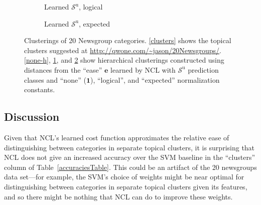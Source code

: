 \documentclass{article} %
\newcommand{\unorderedS}{\mathcal{S}^{\mathrm{u}}}
\newcommand{\ourmethod}{NCL}
\begin{document}
\begin{figure}
\begin{subfigure}{.5\textwidth}
\begin{tikzpicture}
\end{tikzpicture}
\caption{Learned $\unorderedS$, logical}
\label{logical-h}
\end{subfigure}%
\begin{subfigure}{.5\textwidth}
\centering
{}
\caption{Learned $\unorderedS$, expected}
\label{expected-h}
\end{subfigure}
\caption{Clusterings of 20 Newsgroup categories.  \ref{clusters} shows
the topical clusters suggested at \url{http://qwone.com/~jason/20Newsgroups/}.
\ref{none-h}, \ref{logical-h}, and \ref{expected-h} show hierarchical
clusterings constructed using distances from the ``ease'' $\mathbf{e}$ 
learned by \ourmethod{} with $\unorderedS$ prediction classes and
``none'' ($\mathbf{1}$), ``logical'', and ``expected'' normalization
constants.}
\label{hierarchies}
\end{figure}

\subsection{Discussion}

Given that \ourmethod{}'s learned cost function approximates the 
relative ease 
of distinguishing between categories in separate topical clusters, 
it is surprising that \ourmethod{} does not give an increased 
accuracy over the SVM baseline in the ``clusters'' column of
 Table~\ref{accuraciesTable}.
This could be an artifact of the 20 newsgroups data set---for example,
the SVM's choice of weights might be near optimal for 
distinguishing between categories in separate topical clusters
given its features, and so there might be nothing that \ourmethod{}
can do to improve these weights. 
\end{document}
